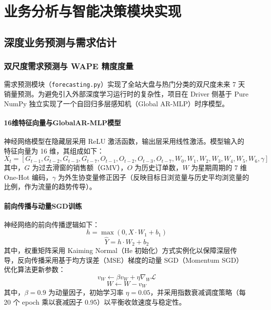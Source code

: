 
\chapter{业务分析与智能决策模块实现}

\section{深度业务预测与需求估计}

\subsection{双尺度需求预测与 WAPE 精度度量}

需求预测模块（\texttt{forecasting.py}）实现了全站大盘与热门分类的双尺度未来 7 天销量预测。为避免引入外部深度学习运行时的复杂性，项目在 Driver 侧基于 Pure NumPy 独立实现了一个自回归多层感知机（Global AR-MLP）时序模型。

\subsubsection{16维特征向量与GlobalAR-MLP模型}

神经网络模型在隐藏层采用 ReLU 激活函数，输出层采用线性激活。模型输入的特征向量为 16 维，其组成如下：
\begin{equation}
    X_t = [G_{t-1}, G_{t-2}, G_{t-3}, G_{t-7}, O_{t-1}, O_{t-2}, O_{t-3}, O_{t-7}, W_0, W_1, W_2, W_3, W_4, W_5, W_6, \gamma]
\end{equation}
其中，$G$ 为过去滑窗的销售额（GMV），$O$ 为历史订单数，$W$ 为星期周期的 7 维 One-Hot 编码，$\gamma$ 为外生协变量修正因子（反映目标日浏览量与历史平均浏览量的比例，作为流量的趋势传导）。

\subsubsection{前向传播与动量SGD训练}

神经网络的前向传播逻辑如下：
\begin{equation}
    h = \max(0, X \cdot W_1 + b_1)
\end{equation}
\begin{equation}
    \hat{Y} = h \cdot W_2 + b_2
\end{equation}
其中，权重矩阵采用 Kaiming Normal（He 初始化）方式实例化以保障深层传导，反向传播采用基于均方误差（MSE）梯度的动量 SGD（Momentum SGD）优化算法更新参数：
\begin{equation}
    v_{W} \leftarrow \beta v_{W} + \eta \nabla_{W} \mathcal{L}
\end{equation}
\begin{equation}
    W \leftarrow W - v_{W}
\end{equation}
其中，$\beta=0.9$ 为动量因子，初始学习率 $\eta=0.05$，并采用指数衰减调度策略（每 20 个 epoch 乘以衰减因子 0.95）以平衡收敛速度与稳定性。

